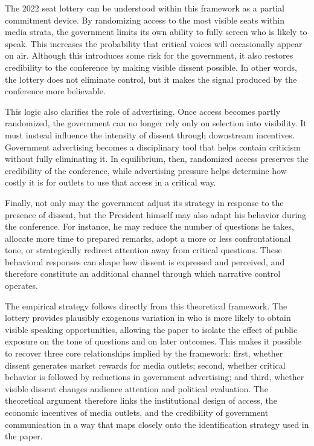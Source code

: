 \documentclass[12pt]{article}
\begin{document}
The 2022 seat lottery can be understood within this framework as a partial commitment device. By randomizing access to the most visible seats within media strata, the government limits its own ability to fully screen who is likely to speak. This increases the probability that critical voices will occasionally appear on air. Although this introduces some risk for the government, it also restores credibility to the conference by making visible dissent possible. In other words, the lottery does not eliminate control, but it makes the signal produced by the conference more believable.

This logic also clarifies the role of advertising. Once access becomes partly randomized, the government can no longer rely only on selection into visibility. It must instead influence the intensity of dissent through downstream incentives. Government advertising becomes a disciplinary tool that helps contain criticism without fully eliminating it. In equilibrium, then, randomized access preserves the credibility of the conference, while advertising pressure helps determine how costly it is for outlets to use that access in a critical way.

Finally, not only may the government adjust its strategy in response to the presence of dissent, but the President himself may also adapt his behavior during the conference. For instance, he may reduce the number of questions he takes, allocate more time to prepared remarks, adopt a more or less confrontational tone, or strategically redirect attention away from critical questions. These behavioral responses can shape how dissent is expressed and perceived, and therefore constitute an additional channel through which narrative control operates.

The empirical strategy follows directly from this theoretical framework. The lottery provides plausibly exogenous variation in who is more likely to obtain visible speaking opportunities, allowing the paper to isolate the effect of public exposure on the tone of questions and on later outcomes. This makes it possible to recover three core relationships implied by the framework: first, whether dissent generates market rewards for media outlets; second, whether critical behavior is followed by reductions in government advertising; and third, whether visible dissent changes audience attention and political evaluation. The theoretical argument therefore links the institutional design of access, the economic incentives of media outlets, and the credibility of government communication in a way that maps closely onto the identification strategy used in the paper.
\end{document}
